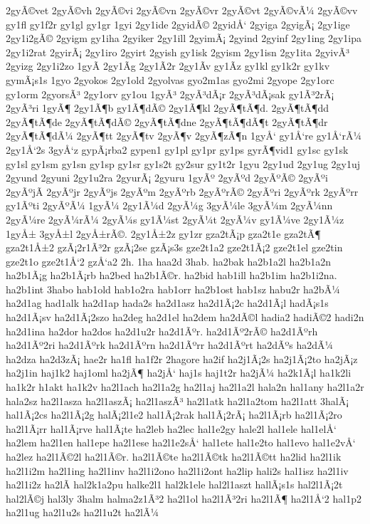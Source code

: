 {2gyÃ©vet
2gyÃ©vh
2gyÃ©vi
2gyÃ©vn
2gyÃ©vr
2gyÃ©vt
2gyÃ©vÃ¼
2gyÃ©vv
gy1fl
gy1f2r
gy1gl
gy1gr
1gyi
2gy1ide
2gyidÃ©
2gyidÅ‘
2gyiga
2gyigÃ¡
2gy1ige
2gy1i2gÃ©
2gyigm
gy1iha
2gyiker
2gy1ill
2gyimÃ¡
2gyind
2gyinf
2gy1ing
2gy1ipa
2gy1i2rat
2gyirÃ¡
2gy1iro
2gyirt
2gyish
gy1isk
2gyism
2gy1isn
2gy1ita
2gyivÃ³
2gyizg
2gy1i2zo
1gyÃ­
2gy1Ã­g
2gy1Ã­2r
2gy1Ã­v
gy1Ã­z
gy1kl
gy1k2r
gy1kv
gymÃ¡s1s
1gyo
2gyokos
2gy1old
2gyolvas
gyo2m1as
gyo2mi
2gyope
2gy1orc
gy1orm
2gyorsÃ³
2gy1orv
gy1ou
1gyÃ³
2gyÃ³dÃ¡r
2gyÃ³dÃ¡sak
gy1Ã³2rÃ¡
2gyÃ³ri
1gyÃ¶
2gy1Ã¶b
gy1Ã¶dÃ©
2gy1Ã¶kl
2gyÃ¶tÃ¶d.
2gyÃ¶tÃ¶dd
2gyÃ¶tÃ¶de
2gyÃ¶tÃ¶dÃ©
2gyÃ¶tÃ¶dne
2gyÃ¶tÃ¶dÃ¶t
2gyÃ¶tÃ¶dr
2gyÃ¶tÃ¶dÃ¼
2gyÃ¶tt
2gyÃ¶tv
2gyÃ¶v
2gyÃ¶zÃ¶n
1gyÅ‘
gy1Å‘re
gy1Å‘rÃ¼
2gy1Å‘2s
3gyÅ‘z
gypÃ¡rba2
gypen1
gy1pl
gy1pr
gy1ps
gyrÃ¶vid1
gy1sc
gy1sk
gy1sl
gy1sm
gy1sn
gy1sp
gy1sr
gy1s2t
gy2sur
gy1t2r
1gyu
2gy1ud
2gy1ug
2gy1uj
2gyund
2gyuni
2gy1u2ra
2gyurÃ¡
2gyuru
1gyÃº
2gyÃºd
2gyÃºÃ©
2gyÃºi
2gyÃºjÃ­
2gyÃºjr
2gyÃºjs
2gyÃºm
2gyÃºrb
2gyÃºrÃ©
2gyÃºri
2gyÃºrk
2gyÃºrr
gy1Ãºti
2gyÃºÃ¼
1gyÃ¼
2gy1Ã¼d
2gyÃ¼g
3gyÃ¼le
3gyÃ¼m
2gyÃ¼nn
2gyÃ¼re
2gyÃ¼rÃ¼
2gyÃ¼s
gy1Ã¼st
2gyÃ¼t
2gyÃ¼v
gy1Ã¼ve
2gy1Ã¼z
1gyÅ±
3gyÅ±l
2gyÅ±rÃ©.
2gy1Å±2z
gy1zr
gza2tÃ¡p
gza2t1e
gza2tÃ¶
gza2t1Å±2
gzÃ¡2r1Ã³2r
gzÃ¡2se
gzÃ¡s3s
gze2t1a2
gze2t1Ã¡2
gze2t1el
gze2tin
gze2t1o
gze2t1Å‘2
gzÅ‘a2
2h.
1ha
haa2d
3hab.
ha2bak
ha2b1a2l
ha2b1a2n
ha2b1Ã¡g
ha2b1Ã¡rb
ha2bed
ha2b1Ã©r.
ha2bid
hab1ill
ha2b1im
ha2b1i2na.
ha2b1int
3habo
hab1old
hab1o2ra
hab1orr
ha2b1ost
hab1sz
habu2r
ha2bÃ¼
ha2d1ag
had1alk
ha2d1ap
hada2s
ha2d1asz
ha2d1Ã¡2c
ha2d1Ã¡l
hadÃ¡s1s
ha2d1Ã¡sv
ha2d1Ã¡2szo
ha2deg
ha2d1el
ha2dem
ha2dÃ©l
hadia2
hadiÃ©2
hadi2n
ha2d1ina
ha2dor
ha2dos
ha2d1u2r
ha2d1Ãºr.
ha2d1Ãº2rÃ©
ha2d1Ãºrh
ha2d1Ãº2ri
ha2d1Ãºrk
ha2d1Ãºrn
ha2d1Ãºrr
ha2d1Ãºrt
ha2dÃºs
ha2dÃ¼
ha2dza
ha2d3zÃ¡
hae2r
ha1fl
ha1f2r
2hagore
ha2if
ha2j1Ã¡2s
ha2j1Ã¡2to
ha2jÃ¡z
ha2j1in
haj1k2
haj1oml
ha2jÃ¶
ha2jÅ‘
haj1s
haj1t2r
ha2jÃ¼
ha2k1Ã¡l
ha1k2li
ha1k2r
h1akt
ha1k2v
ha2l1ach
ha2l1a2g
ha2l1aj
ha2l1a2l
hala2n
hal1any
ha2l1a2r
hala2sz
ha2l1asza
ha2l1aszÃ¡
ha2l1aszÃ³
ha2l1atk
ha2l1a2tom
ha2l1att
3halÃ¡
hal1Ã¡2cs
ha2l1Ã¡2g
halÃ¡2l1e2
hal1Ã¡2rak
hal1Ã¡2rÃ¡
ha2l1Ã¡rb
ha2l1Ã¡2ro
ha2l1Ã¡rr
hal1Ã¡rve
hal1Ã¡te
ha2leb
ha2lec
hal1e2gy
hale2l
hal1ele
hal1elÅ‘
ha2lem
ha2l1en
hal1epe
ha2l1ese
ha2l1e2sÅ‘
hal1ete
hal1e2to
hal1evo
hal1e2vÅ‘
ha2lez
ha2l1Ã©2l
ha2l1Ã©r.
ha2l1Ã©te
ha2l1Ã©tk
ha2l1Ã©tt
ha2lid
ha2l1ik
ha2l1i2m
ha2l1ing
ha2l1inv
ha2l1i2ono
ha2l1i2ont
ha2lip
hali2s
hal1isz
ha2l1iv
ha2l1i2z
ha2lÃ­
hal2k1a2pu
halke2l1
hal2k1ele
hal2l1aszt
hallÃ¡s1s
hal2l1Ã¡2t
hal2lÃ©j
hal3ly
3halm
halma2z1Ã³2
ha2l1ol
ha2l1Ã³2ri
ha2l1Ã¶
ha2l1Å‘2
hal1p2
ha2l1ug
ha2l1u2s
ha2l1u2t
ha2lÃ¼
}
